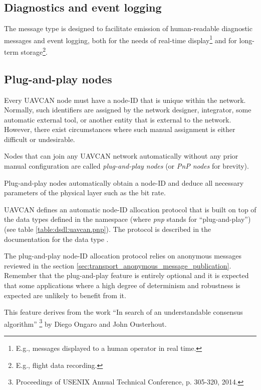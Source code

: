 
\subsection{Diagnostics and event logging}

The message type  is designed to facilitate emission of
human-readable diagnostic messages and event logging,
both for the needs of real-time display\footnote{E.g., messages displayed to a human operator in real time.}
and for long-term storage\footnote{E.g., flight data recording.}.

\subsection{Plug-and-play nodes}

Every UAVCAN node must have a node-ID that is unique within the network.
Normally, such identifiers are assigned by the network designer, integrator, some automatic external tool,
or another entity that is external to the network.
However, there exist circumstances where such manual assignment is either difficult or undesirable.

Nodes that can join any UAVCAN network automatically without any prior manual configuration
are called \emph{plug-and-play nodes} (or \emph{PnP nodes} for brevity).

Plug-and-play nodes automatically obtain a node-ID and deduce all necessary parameters of the physical layer
such as the bit rate.

UAVCAN defines an automatic node-ID allocation protocol that is built on top of the data types defined in the
namespace  (where \emph{pnp} stands for ``plug-and-play'')
(see table \ref{table:dsdl:uavcan.pnp}).
The protocol is described in the documentation for the data type .

The plug-and-play node-ID allocation protocol relies on anonymous messages reviewed in the section
\ref{sec:transport_anonymous_message_publication}.
Remember that the plug-and-play feature is entirely optional and it is expected that some applications where a
high degree of determinism and robustness is expected are unlikely to benefit from it.

This feature derives from the work
``In search of an understandable consensus algorithm''%
\footnote{Proceedings of USENIX Annual Technical Conference, p. 305-320, 2014.}
by Diego Ongaro and John Ousterhout.

